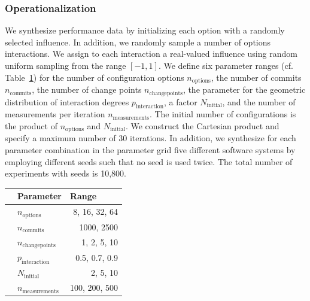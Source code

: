 \documentclass[sigconf]{acmart}
\begin{document}
	\subsubsection{Operationalization}
	We synthesize performance data by initializing each option with a randomly selected influence. In addition, we randomly sample a number of options interactions. We assign to each interaction a real-valued influence using random uniform sampling from the range $[-1, 1]$. We define six parameter ranges (cf. Table~\ref{tab:synthetic_experiment_ranges}) for the number of configuration options $n_\text{options}$, the number of commits $n_\text{commits}$, the number of change points $n_\text{changepoints}$, the parameter for the geometric distribution of interaction degrees $p_\text{interaction}$, a factor $N_\text{initial}$, and the number of measurements per iteration $n_\text{measurements}$. The initial number of configurations is the product of $n_\text{options}$ and $N_\text{initial}$. We construct the Cartesian product and specify a maximum number of 30 iterations. In addition, we synthesize for each parameter combination in the parameter grid five different software systems by employing different seeds such that no seed is used twice. The total number of experiments with seeds is 10,800.%
	
	\begin{table}
	    \centering
	    \label{tab:synthetic_experiment_ranges}
        \begin{tabular}{llr}
			\toprule
			\textbf{}                & \textbf{Parameter}        & \multicolumn{1}{l}{\textbf{Range}} \\
			\midrule
			\parbox[t]{5mm}{} & $n_\text{options}$                & 8, 16, 32, 64                \\
			& $n_\text{commits}$                & 1000, 2500                \\
			& $n_\text{changepoints}$           & 1, 2, 5, 10                        \\
			& $p_\text{interaction}$ & 0.5, 0.7, 0.9                     \\
			\midrule
			\parbox[t]{5mm}{}   & $N_\text{initial}$       & 2, 5, 10                           \\
			& $n_\text{measurements}$           & 100, 200, 500                      \\
			\bottomrule            
		\end{tabular}
	\end{table}
	
\end{document}
